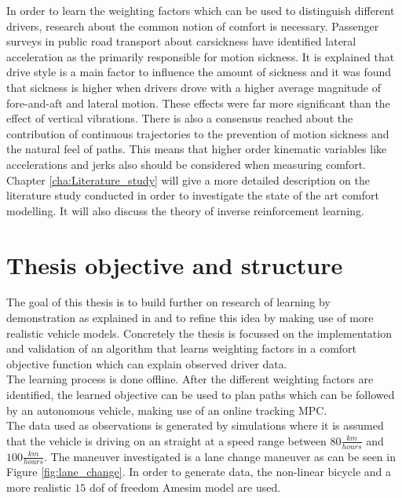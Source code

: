 In order to learn the weighting factors which can be used to distinguish different drivers, research about the common notion of comfort is necessary. Passenger surveys in public road transport about carsickness \cite{Turner1999} have identified lateral acceleration as the primarily responsible for motion sickness. It is explained that drive style is a main factor to influence the amount of sickness and it was found that sickness is higher when drivers drove with a higher average magnitude of fore-and-aft and lateral motion. These effects were far more significant than the effect of vertical vibrations. There is also a consensus reached about the contribution of continuous trajectories to the prevention of motion sickness and the natural feel of paths.\cite{Elbanhawi2015} This means that higher order kinematic variables like accelerations and jerks also should be considered when measuring comfort. Chapter \ref{cha:Literature_study} will give a more detailed description on the literature study conducted in order to investigate the state of the art comfort modelling. It will also discuss the theory of inverse reinforcement learning.\\

\section{Thesis objective and structure}
The goal of this thesis is to build further on research of learning by demonstration as explained in \cite{Kuderer2015a} and to refine this idea by making use of more realistic vehicle models. Concretely the thesis is focussed on the implementation and validation of an algorithm that learns weighting factors in a comfort objective function which can explain observed driver data.\\
The learning process is done offline. After the different weighting factors are identified, the learned objective can be used to plan paths which can be followed by an autonomous vehicle, making use of an online tracking MPC.\\

The data used as observations is generated by simulations where it is assumed that the vehicle is driving on an straight at a speed range between $80\frac{km}{hours}$ and $100\frac{km}{hours}$. The maneuver investigated is a lane change maneuver as can be seen in Figure \ref{fig:lane_change}. In order to generate data, the non-linear bicycle and a more realistic $15$ dof of freedom Amesim model are used.\\

